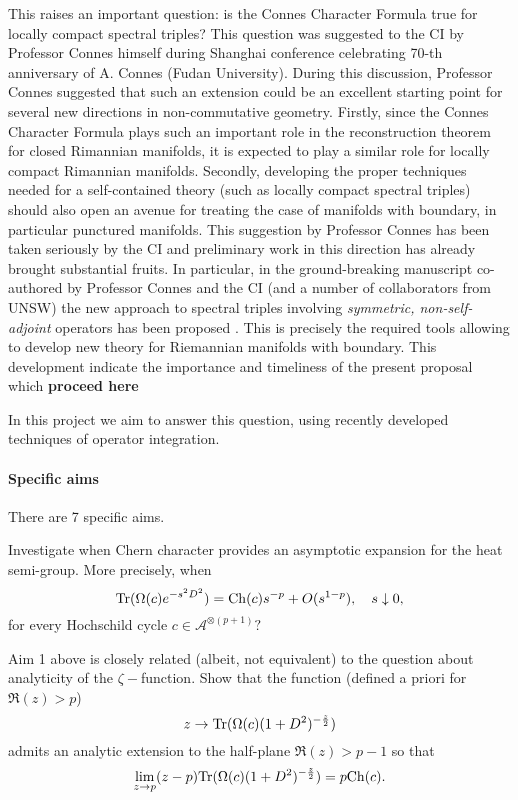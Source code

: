 \documentclass{article}
\begin{document}
This raises an important question: is the Connes Character Formula true for locally compact spectral triples? This question was suggested to the CI by Professor Connes himself during Shanghai conference celebrating 70-th anniversary of A. Connes (Fudan University). During this discussion, Professor Connes suggested that such an extension could be an excellent starting point for several new directions in non-commutative geometry. Firstly, since the Connes Character Formula plays such an important role in the reconstruction theorem for closed Rimannian manifolds, it is expected to play a similar role for locally compact Rimannian manifolds. Secondly, developing the proper techniques needed for a self-contained theory (such as locally compact spectral triples) should also open an avenue for treating the case of manifolds with boundary, in particular punctured manifolds. This suggestion by Professor Connes has been taken seriously by the CI and preliminary work in this direction has already brought substantial fruits. In particular, in the ground-breaking manuscript co-authored by Professor Connes and the CI (and a number of collaborators from UNSW) the new approach to spectral triples involving {\it symmetric, non-self-adjoint} operators has been proposed \cite{Connes_team_symmetric}. This is precisely the required tools allowing to develop new theory for Riemannian manifolds with boundary. This development indicate the importance and timeliness of the present proposal which {\bf proceed here}
    
In this project we aim to answer this question, using recently developed techniques of operator integration.
    

\paragraph*{Specific aims} There are 7 specific aims.


 Investigate when Chern character provides an asymptotic expansion for the heat semi-group. More precisely, when 
\begin{equation}\label{heat eq}
{\rm Tr}(\Omega(c)e^{-s^2D^2})={\rm Ch}(c)s^{-p}+O(s^{1-p}),\quad s\downarrow0,
\end{equation}
for every Hochschild cycle $c\in\mathcal{A}^{\otimes (p+1)}?$ 

 Aim 1 above is closely related (albeit, not equivalent) to the question about analyticity of the $\zeta-$function. Show that the function (defined a priori for $\Re(z)>p$)
$$z\to {\rm Tr}(\Omega(c)(1+D^2)^{-\frac{z}{2}})$$
admits an analytic extension to the half-plane $\Re(z)>p-1$ so that
$$\lim_{z\to p}(z-p){\rm Tr}(\Omega(c)(1+D^2)^{-\frac{z}{2}})=p{\rm Ch}(c).$$
\end{document}
